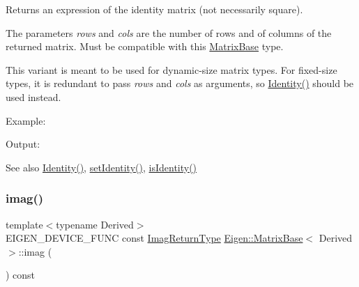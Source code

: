 \begin{DoxyReturn}{Returns}
an expression of the identity matrix (not necessarily square).
\end{DoxyReturn}
The parameters {\itshape rows} and {\itshape cols} are the number of rows and of columns of the returned matrix. Must be compatible with this \mbox{\hyperlink{class_eigen_1_1_matrix_base}{Matrix\+Base}} type.

This variant is meant to be used for dynamic-\/size matrix types. For fixed-\/size types, it is redundant to pass {\itshape rows} and {\itshape cols} as arguments, so \mbox{\hyperlink{class_eigen_1_1_matrix_base_a2ef43190f3aba0aef0cf1030d46d0ca7}{Identity()}} should be used instead.

Example\+: 
\begin{DoxyCodeInclude}{0}
\end{DoxyCodeInclude}
 Output\+: 
\begin{DoxyVerbInclude}
\end{DoxyVerbInclude}


\begin{DoxySeeAlso}{See also}
\mbox{\hyperlink{class_eigen_1_1_matrix_base_a2ef43190f3aba0aef0cf1030d46d0ca7}{Identity()}}, \mbox{\hyperlink{class_eigen_1_1_matrix_base_ae05be7fcc1ade707f0b73eb5f9d8cf33}{set\+Identity()}}, \mbox{\hyperlink{class_eigen_1_1_matrix_base_a4ccbd8dfa06e9d47b9bf84711f8b9d40}{is\+Identity()}} 
\end{DoxySeeAlso}
\mbox{\label{class_eigen_1_1_matrix_base_ae1bf94b5a4680abddd29dc4153ad8ba8}} 
\subsubsection{\texorpdfstring{imag()}{imag()}\hspace{0.1cm}{\footnotesize\ttfamily [1/2]}}
{\footnotesize\ttfamily template$<$typename Derived$>$ \\
E\+I\+G\+E\+N\+\_\+\+D\+E\+V\+I\+C\+E\+\_\+\+F\+U\+NC const \mbox{\hyperlink{class_eigen_1_1_cwise_unary_op}{Imag\+Return\+Type}} \mbox{\hyperlink{class_eigen_1_1_matrix_base}{Eigen\+::\+Matrix\+Base}}$<$ Derived $>$\+::imag (\begin{DoxyParamCaption}{ }\end{DoxyParamCaption}) const\hspace{0.3cm}{\ttfamily [inline]}}


